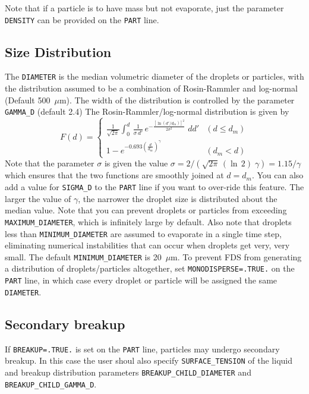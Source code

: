 \documentclass[11pt]{book}
\newcommand{\ct}{\tt\small}
\newcommand{\be}{\begin{equation}}
\newcommand{\ee}{\end{equation}}
\begin{document}
Note that if a particle is to have mass but not evaporate, just the parameter {\ct DENSITY} can be provided on the {\ct PART} line.

\subsection{Size Distribution}
\label{info:particle_size}

The {\ct DIAMETER} is the median volumetric diameter of the droplets or particles, with the
distribution assumed to be a combination of Rosin-Rammler and log-normal (Default 500~$\mu$m). The
width of the distribution is controlled by the parameter {\ct GAMMA\_D} (default 2.4)
The Rosin-Rammler/log-normal distribution is given by
\be F(d) = \left\{ \begin{array}{ll}
   \frac{1}{\sqrt{2\pi}} {\displaystyle \int_0^d} \, \frac{1}{\sigma\, d'} \,
   e^{-\frac{[\ln(d'/d_m)]^2}{2\sigma^2}} \; dd'       & (d \le d_m) \\
   1 - e^{-0.693 \left(\frac{d}{d_m}\right)^\gamma }  & (d_m < d)
   \end{array} \right.
\ee
Note that the parameter $\sigma$ is given the value
$\sigma=2/(\sqrt{2\pi} \, (\ln\,2) \; \gamma)=1.15/\gamma$
which ensures that the two functions are smoothly joined at $d=d_m$. You can also add a value for {\ct SIGMA\_D} to the {\ct PART} line if you want to
over-ride this feature.
The larger the value of $\gamma$, the narrower the droplet size is
distributed about the median value. Note that you can prevent droplets or particles from
exceeding {\ct MAXIMUM\_DIAMETER}, which is infinitely large by default. Also note that
droplets less than {\ct MINIMUM\_DIAMETER} are assumed to evaporate in a single time step, eliminating numerical
instabilities that can occur when droplets get very, very small. The default {\ct MINIMUM\_DIAMETER} is 20~$\mu$m.
To prevent FDS from generating a distribution of droplets/particles altogether, set
{\ct MONODISPERSE=.TRUE.} on the {\ct PART} line, in which case every droplet or particle will be assigned the
same {\ct DIAMETER}.

\subsection{Secondary breakup}
\label{info:secondary_breakup}
If {\ct BREAKUP=.TRUE.} is set on the {\ct PART} line, particles may undergo secondary breakup. In this case the user shoul also specify {\ct SURFACE\_TENSION} of the liquid and breakup distribution parameters {\ct BREAKUP\_CHILD\_DIAMETER} and {\ct BREAKUP\_CHILD\_GAMMA\_D}.
\end{document}
